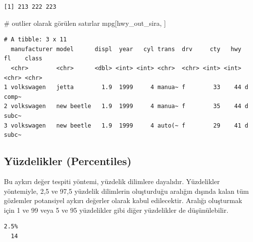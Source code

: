 \documentclass[
  letterpaper,
  DIV=11,
  numbers=noendperiod]{scrreprt}
\newenvironment{Shaded}{\begin{snugshade}}{\end{snugshade}}
\newcommand{\CommentTok}[1]{\textcolor[rgb]{0.37,0.37,0.37}{#1}}
\newcommand{\FloatTok}[1]{\textcolor[rgb]{0.68,0.00,0.00}{#1}}
\newcommand{\FunctionTok}[1]{\textcolor[rgb]{0.28,0.35,0.67}{#1}}
\newcommand{\NormalTok}[1]{\textcolor[rgb]{0.00,0.23,0.31}{#1}}
\newcommand{\OtherTok}[1]{\textcolor[rgb]{0.00,0.23,0.31}{#1}}
\newcommand{\SpecialCharTok}[1]{\textcolor[rgb]{0.37,0.37,0.37}{#1}}
\begin{document}
\begin{verbatim}
[1] 213 222 223
\end{verbatim}

\begin{Shaded}
\begin{Highlighting}[]
\CommentTok{\# outlier olarak görülen satırlar}
\NormalTok{mpg[hwy\_out\_sira, ]}
\end{Highlighting}
\end{Shaded}

\begin{verbatim}
# A tibble: 3 x 11
  manufacturer model      displ  year   cyl trans  drv     cty   hwy fl    class
  <chr>        <chr>      <dbl> <int> <int> <chr>  <chr> <int> <int> <chr> <chr>
1 volkswagen   jetta        1.9  1999     4 manua~ f        33    44 d     comp~
2 volkswagen   new beetle   1.9  1999     4 manua~ f        35    44 d     subc~
3 volkswagen   new beetle   1.9  1999     4 auto(~ f        29    41 d     subc~
\end{verbatim}

\subsection*{Yüzdelikler
(Percentiles)}\label{yuxfczdelikler-percentiles}

Bu aykırı değer tespiti yöntemi, yüzdelik dilimlere dayalıdır.
Yüzdelikler yöntemiyle, 2,5 ve 97,5 yüzdelik dilimlerin oluşturduğu
aralığın dışında kalan tüm gözlemler potansiyel aykırı değerler olarak
kabul edilecektir. Aralığı oluşturmak için 1 ve 99 veya 5 ve 95
yüzdelikler gibi diğer yüzdelikler de düşünülebilir.

\begin{Shaded}
\end{Shaded}

\begin{verbatim}
2.5% 
  14 
\end{verbatim}

\begin{Shaded}
\end{Shaded}
\end{document}

